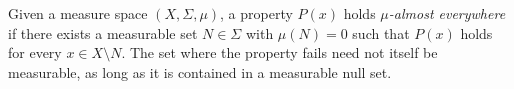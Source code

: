 
Given a measure space $(X,\Sigma,\mu)$, a property $P(x)$ holds \emph{$\mu$-almost everywhere} if there exists a measurable set $N\in\Sigma$ with $\mu(N)=0$ such that $P(x)$ holds for every $x\in X\setminus N$. The set where the property fails need not itself be measurable, as long as it is contained in a measurable null set.
